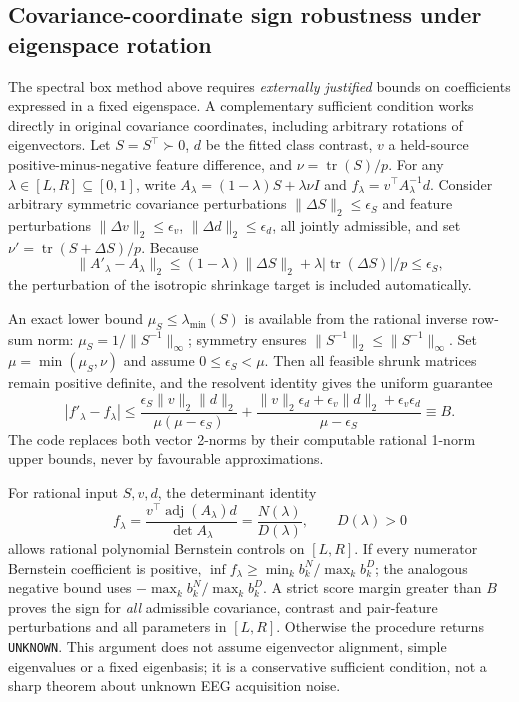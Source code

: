 \subsection{Covariance-coordinate sign robustness under eigenspace rotation}
\label{sec:p4-cov-resolvent}
The spectral box method above requires \emph{externally justified}
bounds on coefficients expressed in a fixed eigenspace.
A complementary sufficient condition works directly in original
covariance coordinates, including arbitrary rotations of eigenvectors.
Let $S=S^\top\succ0$, $d$ be the fitted class contrast,
$v$ a held-source positive-minus-negative feature difference,
and $\nu=\operatorname{tr}(S)/p$. For any
$\lambda\in[L,R]\subseteq[0,1]$, write
$A_\lambda=(1-\lambda)S+\lambda\nu I$ and
$f_\lambda=v^\top A_\lambda^{-1}d$.
Consider arbitrary symmetric covariance perturbations
$\|\Delta S\|_2\le\epsilon_S$ and feature perturbations
$\|\Delta v\|_2\le\epsilon_v$,
$\|\Delta d\|_2\le\epsilon_d$, all jointly admissible,
and set $\nu'=\operatorname{tr}(S+\Delta S)/p$.
Because
\[
\|A'_\lambda-A_\lambda\|_2
\le(1-\lambda)\|\Delta S\|_2+
\lambda|\operatorname{tr}(\Delta S)|/p
\le\epsilon_S,
\]
the perturbation of the isotropic shrinkage target
is included automatically.

An exact lower bound $\mu_S\le\lambda_{\min}(S)$
is available from the rational inverse row-sum norm:
$\mu_S=1/\|S^{-1}\|_\infty$;
symmetry ensures $\|S^{-1}\|_2\le\|S^{-1}\|_\infty$.
Set $\mu=\min(\mu_S,\nu)$ and assume
$0\le\epsilon_S<\mu$.
Then all feasible shrunk matrices remain positive definite,
and the resolvent identity gives the uniform guarantee
\[
|f'_\lambda-f_\lambda|\le
\frac{\epsilon_S\|v\|_2\|d\|_2}
     {\mu(\mu-\epsilon_S)}
+\frac{\|v\|_2\epsilon_d+
       \epsilon_v\|d\|_2+\epsilon_v\epsilon_d}
      {\mu-\epsilon_S}
\equiv B.
\]
The code replaces both vector 2-norms by their
computable rational 1-norm upper bounds, never by
favourable approximations.

For rational input $S,v,d$, the determinant identity
\[
f_\lambda =
\frac{v^\top\operatorname{adj}(A_\lambda)d}
     {\det A_\lambda} =
\frac{N(\lambda)}{D(\lambda)},\qquad D(\lambda)>0
\]
allows rational polynomial Bernstein controls on $[L,R]$.
If every numerator Bernstein coefficient is positive,
$\inf f_\lambda\ge
\min_k b^N_k/\max_k b^D_k$;
the analogous negative bound uses
$-\max_k b^N_k/\max_k b^D_k$.
A strict score margin greater than $B$ proves the
sign for \emph{all} admissible covariance, contrast and
pair-feature perturbations and all parameters in $[L,R]$.
Otherwise the procedure returns \texttt{UNKNOWN}.
This argument does not assume eigenvector alignment,
simple eigenvalues or a fixed eigenbasis; it is a
conservative sufficient condition, not a sharp theorem
about unknown EEG acquisition noise.

